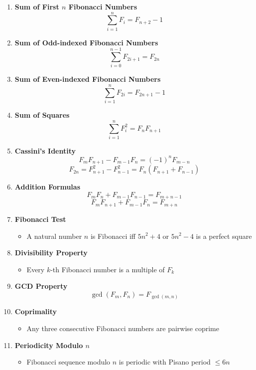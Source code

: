 \documentclass[twoside]{article}
\begin{document}
\begin{multicols*}{2}
\begin{enumerate}[leftmargin=*]
    \item \textbf{Sum of First $n$ Fibonacci Numbers}
        \[\sum_{i=1}^n F_i = F_{n+2} - 1\]
    
    \item \textbf{Sum of Odd-indexed Fibonacci Numbers}
        \[\sum_{i=0}^{n-1} F_{2i+1} = F_{2n}\]
    
    \item \textbf{Sum of Even-indexed Fibonacci Numbers}
        \[\sum_{i=1}^n F_{2i} = F_{2n+1} - 1\]
    
    \item \textbf{Sum of Squares}
        \[\sum_{i=1}^n F_i^2 = F_n F_{n+1}\]
    
    \item \textbf{Cassini's Identity}
        \[F_m F_{n+1} - F_{m-1} F_n = (-1)^n F_{m-n}\]
        \[F_{2n} = F_{n+1}^2 - F_{n-1}^2 = F_n(F_{n+1} + F_{n-1})\]
    
    \item \textbf{Addition Formulas}
        \[F_m F_n + F_{m-1} F_{n-1} = F_{m+n-1}\]
        \[F_m F_{n+1} + F_{m-1} F_n = F_{m+n}\]
    
    \item \textbf{Fibonacci Test}
        \begin{itemize}
            \item A natural number $n$ is Fibonacci iff $5n^2 + 4$ or $5n^2 - 4$ is a perfect square
        \end{itemize}
    
    \item \textbf{Divisibility Property}
        \begin{itemize}
            \item Every $k$-th Fibonacci number is a multiple of $F_k$
        \end{itemize}
    
    \item \textbf{GCD Property}
        \[\gcd(F_m, F_n) = F_{\gcd(m,n)}\]
    
    \item \textbf{Coprimality}
        \begin{itemize}
            \item Any three consecutive Fibonacci numbers are pairwise coprime
        \end{itemize}
    
    \item \textbf{Periodicity Modulo $n$}
        \begin{itemize}
            \item Fibonacci sequence modulo $n$ is periodic with Pisano period $\leq 6n$
        \end{itemize}
\end{enumerate}


\end{multicols*}
\end{document}

